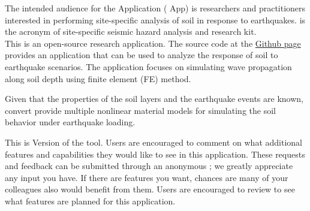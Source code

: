 The intended audience for the \texttt{\getsoftwarename{}} Application (\texttt{\getsoftwarename{}} App) is researchers and practitioners
interested in performing site-specific analysis of soil in  response to earthquakes. \texttt{\getsoftwarename{}}  is the acronym of site-specific seismic hazard analysis and research kit.  \\

This is an open-source research application. The source code at
the \href{https://github.com/NHERI-SimCenter/s3hark}{\texttt{\getsoftwarename{}}
Github page} provides an application that can be used to analyze the response of soil to earthquake scenarios.
The application focuses on simulating wave propagation along soil depth using finite element (FE) method. 

Given that the properties of the soil layers and the earthquake events are known,
 \texttt{\getsoftwarename{}} convert provide multiple nonlinear material models for simulating the soil behavior under earthquake loading.



This is Version \getsoftwareversion{} of the tool. Users are
encouraged to comment on what additional features and capabilities
they would like to see in this application. These requests and
feedback can be submitted through an anonymous ; we greatly appreciate any input you have. If there are
features you want, chances are many of your colleagues also would
benefit from them. Users are encouraged to review
 to see what features are planned for this
application.

